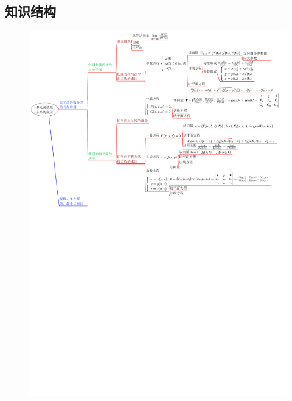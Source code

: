 \documentclass[12pt,UTF8]{ctexart}
\begin{document}
\subsection{知识结构}
\begin{figure}[H]
\begin{center}
\includegraphics[height=0.9\textheight,angle=0]{20190610.pdf}
\end{center}
\end{figure}
\end{document}
